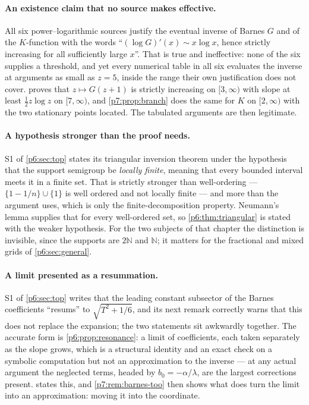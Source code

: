 \documentclass[11pt,a4paper,oneside]{book}
\theoremstyle{plain}
\theoremstyle{definition}
\theoremstyle{remark}
\newcommand{\Nat}{\mathbb{N}}
\begin{document}
\paragraph{An existence claim that no source makes effective.}
All six power--logarithmic sources justify the eventual inverse of Barnes
\(G\) and of the \(K\)-function with the words ``\((\log G)'(x)\sim x\log x\),
hence strictly increasing for all sufficiently large \(x\)''.  That is true
and ineffective: none of the six supplies a threshold, and yet every
numerical table in all six evaluates the inverse at arguments as small as
\(z=5\), inside the range their own justification does not cover.
 proves that \(z\mapsto G(z+1)\) is strictly
increasing on \([3,\infty)\) with slope at least \(\tfrac12z\log z\) on
\([7,\infty)\), and \cref{p7:prop:branch} does the same for \(K\) on
\([2,\infty)\) with the two stationary points located.  The tabulated
arguments are then legitimate.

\paragraph{A hypothesis stronger than the proof needs.}
\textsf{S1} of \cref{p6:sec:top} states its triangular inversion theorem
under the hypothesis that the support semigroup be \emph{locally finite},
meaning that every bounded interval meets it in a finite set.  That is
strictly stronger than well-ordering --- \(\{1-1/n\}\cup\{1\}\) is well
ordered and not locally finite --- and more than the argument uses, which is
only the finite-decomposition property.  Neumann's lemma supplies that for
every well-ordered set, so \cref{p6:thm:triangular} is stated with the weaker
hypothesis.  For the two subjects of that chapter the distinction is
invisible, since the supports are \(2\Nat\) and \(\Nat\); it matters for the
fractional and mixed grids of \cref{p6:sec:general}.

\paragraph{A limit presented as a resummation.}
\textsf{S1} of \cref{p6:sec:top} writes that the leading constant subsector of
the Barnes coefficients ``resums'' to \(\sqrt{T^{2}+1/6}\), and its next
remark correctly warns that this does not replace the expansion; the two
statements sit awkwardly together.  The accurate form is
\cref{p6:prop:resonance}: a limit of coefficients, each taken separately as
the slope grows, which is a structural identity and an exact check on a
symbolic computation but not an approximation to the inverse --- at any actual
argument the neglected terms, headed by \(b_0=-\alpha/\lambda\), are the
largest corrections present.   states this, and
\cref{p7:rem:barnes-too} then shows what does turn the limit into an
approximation: moving it into the coordinate.
\end{document}
